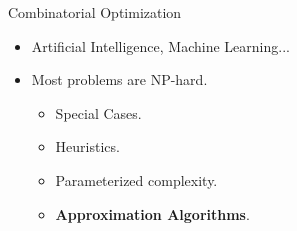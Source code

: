 \begin{frame}{Combinatorial Optimization}
\begin{itemize}[<+->]
  \item Artificial Intelligence, Machine Learning...
  \item Most problems are NP-hard.
	\begin{itemize}[<+->]
	  \item Special Cases.
	  \item Heuristics.
	  \item Parameterized complexity.
	  \item \textbf{Approximation Algorithms}.
	\end{itemize}
\end{itemize}
\end{frame}